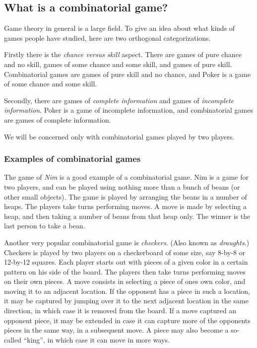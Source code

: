 \subsection{What is a combinatorial game?}

Game theory in general is a large field.
To give an idea about what kinds of games people have studied, here are two orthogonal categorizations.

Firstly there is the \emph {chance versus skill} aspect. There are games of pure chance and no skill, games of some chance and some skill, and games of pure skill.
Combinatorial games are games of pure skill and no chance, and Poker is a game of some chance and some skill.

Secondly, there are games of \emph{complete information} and games of \emph{incomplete information}.
Poker is a game of incomplete information, and combinatorial games are games of complete information.

We will be concerned only with combinatorial games played by two players.

\subsubsection{Examples of combinatorial games}

The game of \emph{Nim} is a good example of a combinatorial game.
Nim is a game for two players, and can be played using nothing more than a bunch of beans (or other small objects).
The game is played by arranging the beans in a number of heaps.
The players take turns performing moves. A move is made by selecting a heap, and then taking a number of beans from that heap only. The winner is the last person to take a bean.

Another very popular combinatorial game is \emph{checkers}. (Also known as \emph{draughts}.)
Checkers is played by two players on a checkerboard of some size, say 8-by-8 or 12-by-12 squares.
Each player starts out with pieces of a given color in a certain pattern on his side of the board.
The players then take turns performing moves on their own pieces.
A move consists in selecting a piece of ones own color, and moving it to an adjacent location.
If the opponent has a piece in such a location, it may be captured by jumping over it to the next adjacent location in the same direction, in which case it is removed from the board. If a move captured an opponent piece, it may be extended in case it can capture more of the opponents pieces in the same way, in a subsequent move. A piece may also become a so-called ``king'', in which case it can move in more ways.

